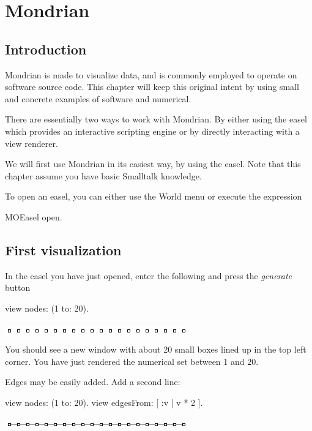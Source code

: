 \documentclass[a4paper,10pt,twoside]{book}
\begin{document}
\fi
\sloppy
\chapter{Mondrian}
\section{Introduction}
Mondrian is made to visualize data, and is commonly employed to operate on software source code. This chapter will keep this original intent by using small and concrete examples of software and numerical.

There are essentially two ways to work with Mondrian. By either using the easel which provides an interactive scripting engine or by directly interacting with a view renderer. 

We will first use Mondrian in its easiest way, by using the easel. Note that this chapter assume you have basic Smalltalk knowledge.

To open an easel, you can either use the World menu or execute the expression

\begin{code}{}
MOEasel open.
\end{code}

\section{First visualization}
In the easel you have just opened, enter the following and press the \emph{generate} button

\begin{code}{}
view nodes: (1 to: 20).
\end{code}
\begin{center}\includegraphics[scale=0.4]{picture1}\end{center}


You should see a new window with about 20 small boxes lined up in the top left corner. You have just rendered the numerical set between 1 and 20.

Edges may be easily added. Add a second line:

\begin{code}{}
view nodes: (1 to: 20).
view edgesFrom: [ :v | v * 2 ].
\end{code}
\begin{center}\includegraphics[scale=0.4]{picture2}\end{center}
\end{document}
